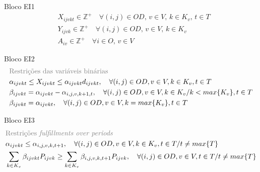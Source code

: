 \begin{bloque1}{Bloco \hypertarget{frase:EI1}{EI1} }
\begin{align}
	 & X_{ijvkt} \in \mathbb{Z}^+ \quad \forall(i,j) \in OD,\, v \in V,\, k \in K_v,\, t \in T  \label{eq: m1_dom_assig}                                                                                                     \\
	 & Y_{ijvk} \in \mathbb{Z}^+ \quad \forall(i,j) \in OD,\, v \in V,\, k \in K_v  \label{eq: m1_dom_autho}                                                                                                                  \\
	 & A_{iv} \in \mathbb{Z}^+ \quad \forall i \in O,\, v \in V  \label{eq: m1_dom_disponi}
\end{align}
\end{bloque1}


\begin{bloque2}{Bloco \hypertarget{frase:EI2}{EI2}} 
\allowdisplaybreaks
\begin{align}
	& \textcolor{gray}{\text{Restrições das variáveis binárias}} \notag   \\  
	& \alpha_{ijvkt} \leq X_{ijvkt} \leq \alpha_{ijvkt}d_{ijvkt}, \quad   \forall(i,j) \in OD, v \in V, k \in K_v, t \in T   \label{eq: m1_binaria_alpha}                                                                   \\
	& \beta_{ijvkt} = \alpha_{ijvkt} - \alpha_{i,j,v,k+1,t}, \quad \forall (i,j) \in OD, v \in V, k \in K_v /k < max\{K_v\}, t\in T    \label{eq: m1_binaria_Beta}                                                             \\
	& \beta_{ijvkt} = \alpha_{ijvkt}, \quad   \forall(i,j) \in OD, v \in V, k = max\{K_v\}, t \in T    \label{eq: m1_binaria_Beta_last}                                                                                   
\end{align}
\end{bloque2}


\begin{bloque3}{Bloco \hypertarget{frase:EI3}{EI3}}
\allowdisplaybreaks
\begin{align}
	& \textcolor{gray}{\text{Restrições \textit{fulfillments over periods}}} \notag   \\                     
	& \alpha_{ijvkt} \leq \alpha_{i,j,v,k,t+1}, \quad   \forall(i,j) \in OD, v \in V, k \in K_v, t \in T/ t \neq max\{T\}     \label{eq: m1_assig_last_periodo}                                                             \\
	& \sum_{k \in K_v}\beta_{ijvkt}P_{ijvk} \geq \sum_{k \in K_v}\beta_{i,j,v,k,t+1}P_{ijvk},  \quad   \forall(i,j) \in OD, v \in V, t \in T/ t \neq max\{T\}   \label{eq: m1_fulfill_periodo}
\end{align}
\end{bloque3}


